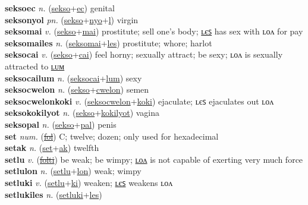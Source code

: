 \textbf{seksoec} \textit{n.} (\hyperref[sekso]{sekso}+\hyperref[ec]{ec})
genital \label{seksoec} \\
\textbf{seksonyol} \textit{pn.} (\hyperref[sekso]{sekso}+\hyperref[nyo]{nyo}+\hyperref[l]{l})
virgin \label{seksonyol} \\
\textbf{seksomai} \textit{v.} (\hyperref[sekso]{sekso}+\hyperref[mai]{mai})
prostitute; sell one’s body; \hyperref[seksomailes]{ʟєꜱ} has sex with ʟᴏᴧ for pay \label{seksomai} \\
\textbf{seksomailes} \textit{n.} (\hyperref[seksomai]{seksomai}+\hyperref[les]{les})
prostitute; whore; harlot \label{seksomailes} \\
\textbf{seksocai} \textit{v.} (\hyperref[sekso]{sekso}+\hyperref[cai]{cai})
feel horny; sexually attract; be sexy; ʟᴏᴧ is sexually attracted to \hyperref[seksocailum]{ʟᴜᴍ} \label{seksocai} \\
\textbf{seksocailum} \textit{n.} (\hyperref[seksocai]{seksocai}+\hyperref[lum]{lum})
sexy \label{seksocailum} \\
\textbf{seksocwelon} \textit{n.} (\hyperref[sekso]{sekso}+\hyperref[cwelon]{cwelon})
semen \label{seksocwelon} \\
\textbf{seksocwelonkoki} \textit{v.} (\hyperref[seksocwelon]{seksocwelon}+\hyperref[koki]{koki})
ejaculate; ʟєꜱ ejaculates out ʟᴏᴧ \label{seksocwelonkoki} \\
\textbf{seksokokilyot} \textit{n.} (\hyperref[sekso]{sekso}+\hyperref[kokilyot]{kokilyot})
vagina \label{seksokokilyot} \\
\textbf{seksopal} \textit{n.} (\hyperref[sekso]{sekso}+\hyperref[pal]{pal})
penis \label{seksopal} \\
\textbf{set} \textit{num.} (\hyperref[fol]{\sout{fol}})
C; twelve; dozen; only used for hexadecimal \label{set} \\
\textbf{setak} \textit{n.} (\hyperref[set]{set}+\hyperref[ak]{ak})
twelfth \label{setak} \\
\textbf{setlu} \textit{v.} (\hyperref[folti]{\sout{folti}})
be weak; be wimpy; \hyperref[setlulon]{ʟᴏᴧ} is not capable of exerting very much force \label{setlu} \\
\textbf{setlulon} \textit{n.} (\hyperref[setlu]{setlu}+\hyperref[lon]{lon})
weak; wimpy \label{setlulon} \\
\textbf{setluki} \textit{v.} (\hyperref[setlu]{setlu}+\hyperref[ki]{ki})
weaken; \hyperref[setlukiles]{ʟєꜱ} weakens ʟᴏᴧ \label{setluki} \\
\textbf{setlukiles} \textit{n.} (\hyperref[setluki]{setluki}+\hyperref[les]{les})
